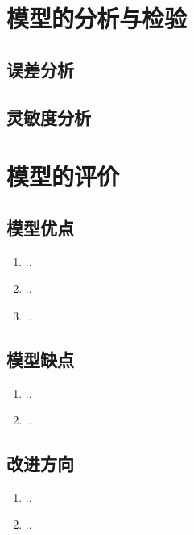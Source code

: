 \documentclass[withoutpreface,bwprint]{cumcmthesis} %
\begin{document}
\section{模型的分析与检验}
\subsection{误差分析}
\subsection{灵敏度分析}


\section{模型的评价}
\subsection{模型优点}
\begin{enumerate}
    \item ..
    \item ..
    \item ..
\end{enumerate}

\subsection{模型缺点}
\begin{enumerate}
    \item ..
    \item ..
\end{enumerate}

\subsection{改进方向}
\begin{enumerate}
    \item ..
    \item ..
\end{enumerate}



\end{document}
